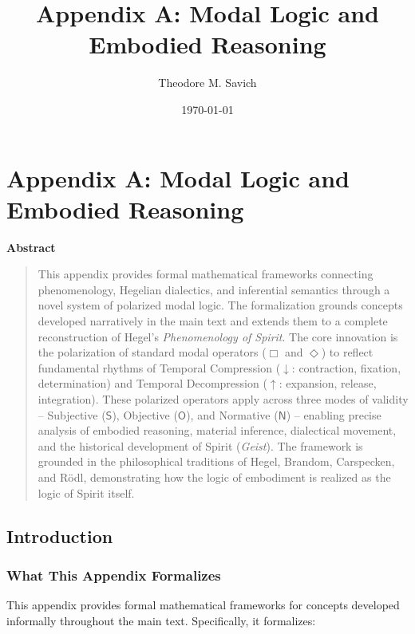 \documentclass[12pt]{book}
\title{Appendix A: Modal Logic and Embodied Reasoning}
\author{Theodore M. Savich}
\date{\today}
\newenvironment{abstract}
    {
      \begin{center}
        \textbf{Abstract}
      \end{center}
      \vspace{\baselineskip}
      \begin{quotation}
      \small
    }
    {
      \end{quotation}
      \bigskip
    }
\begin{document}
\maketitle

\chapter{Appendix A: Modal Logic and Embodied Reasoning}

\begin{abstract}
This appendix provides formal mathematical frameworks connecting phenomenology, Hegelian dialectics, and inferential semantics through a novel system of polarized modal logic. The formalization grounds concepts developed narratively in the main text and extends them to a complete reconstruction of Hegel's \emph{Phenomenology of Spirit}. The core innovation is the polarization of standard modal operators ($\Box$ and $\Diamond$) to reflect fundamental rhythms of Temporal Compression ($\downarrow$: contraction, fixation, determination) and Temporal Decompression ($\uparrow$: expansion, release, integration). These polarized operators apply across three modes of validity -- Subjective ($\mathsf{S}$), Objective ($\mathsf{O}$), and Normative ($\mathsf{N}$) -- enabling precise analysis of embodied reasoning, material inference, dialectical movement, and the historical development of Spirit (\emph{Geist}). The framework is grounded in the philosophical traditions of Hegel, Brandom, Carspecken, and Rödl, demonstrating how the logic of embodiment is realized as the logic of Spirit itself.
\end{abstract}

\section{Introduction}

\subsection{What This Appendix Formalizes}

This appendix provides formal mathematical frameworks for concepts developed informally throughout the main text. Specifically, it formalizes:
\end{document}
